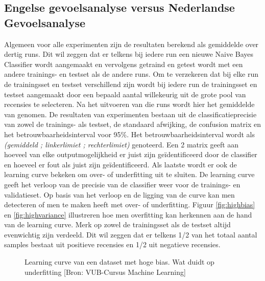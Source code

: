 
\begin{appendices}

\chapter{Engelse gevoelsanalyse versus Nederlandse Gevoelsanalyse}\label{Naive Bayes Classifier met hetzelfde onderwerp voor trainings- en testset}
Algemeen voor alle experimenten zijn de resultaten berekend als gemiddelde over dertig runs. Dit wil zeggen dat er telkens bij iedere run een nieuwe Naive Bayes Classifier wordt aangemaakt en vervolgens getraind en getest wordt met een andere trainings- en testset als de andere runs. Om te verzekeren dat bij elke run de trainingsset en testset verschillend zijn wordt bij iedere run de trainingsset en testset aangemaakt  door een bepaald aantal willekeurig uit de grote pool van recensies te selecteren. Na het uitvoeren van die runs wordt hier het gemiddelde van genomen. De resultaten van experimenten bestaan uit de classificatieprecisie van zowel de trainings- als testset, de standaard afwijking, de confusion matrix en het betrouwbaarheidsinterval voor 95\%. Het betrouwbaarheidsinterval wordt als \textit{(gemiddeld ; linkerlimiet ; rechterlimiet)} genoteerd. Een 2 matrix geeft aan hoeveel van elke outputmogelijkheid er juist zijn ge\"identificeerd door de classifier en hoeveel er fout als juist zijn ge\"identificeerd. Als laatste wordt er ook de learning curve bekeken om over- of underfitting uit te sluiten. De learning curve geeft het verloop van de precisie van de classifier weer voor de trainings- en validatieset. Op basis van het verloop en de ligging van de curve kan men detecteren of men te maken heeft met over- of underfitting. Figuur \ref{fig:highbias} en \ref{fig:highvariance} illustreren hoe men overfitting kan herkennen aan de hand van de learning curve. Merk op zowel de trainingsset als de testset altijd evenwichtig zijn verdeeld. Dit wil zeggen dat er telkens 1/2 van het totaal aantal samples bestaat uit positieve recensies en 1/2 uit negatieve recensies.
\newpage
\begin{figure}[h]
    \centering
    \caption{Learning curve van een dataset met hoge bias. Wat duidt op underfitting [Bron: VUB-Cursus Machine Learning]}

\end{figure}
\end{appendices}
